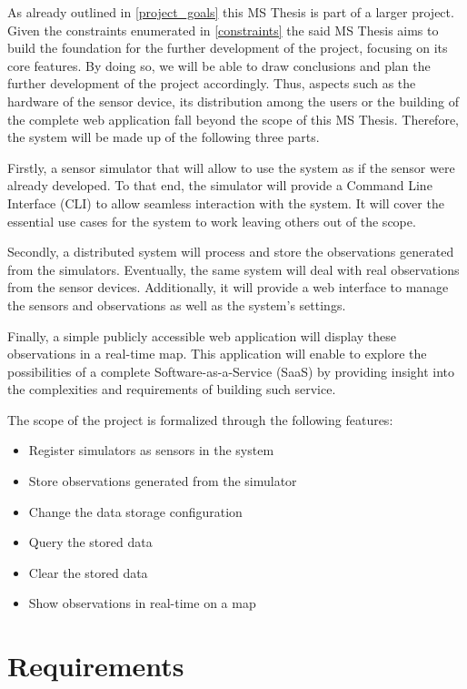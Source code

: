 As already outlined in \ref{project_goals} this MS Thesis is part of a larger project. Given the constraints enumerated in \ref{constraints} the said MS Thesis aims to build the foundation for the further development of the project, focusing on its core features. By doing so, we will be able to draw conclusions and plan the further development of the project accordingly. Thus, aspects such as the hardware of the sensor device, its distribution among the users or the building of the complete web application fall beyond the scope of this MS Thesis. Therefore, the system will be made up of the following three parts.

Firstly, a sensor simulator that will allow to use the system as if the sensor were already developed. To that end, the simulator will provide a Command Line Interface (CLI) to allow seamless interaction with the system. It will cover the essential use cases for the system to work leaving others out of the scope.

Secondly, a distributed system will process and store the observations generated from the simulators. Eventually, the same system will deal with real observations from the sensor devices. Additionally, it will provide a web interface to manage the sensors and observations as well as the system's settings.

Finally, a simple publicly accessible web application will display these observations in a real-time map. This application will enable to explore the possibilities of a complete Software-as-a-Service (SaaS) by providing insight into the complexities and requirements of building such service.

The scope of the project is formalized through the following features:

\begin{itemize}
\item Register simulators as sensors in the system
\item Store observations generated from the simulator
\item Change the data storage configuration
\item Query the stored data
\item Clear the stored data
\item Show observations in real-time on a map
\end{itemize}

\section{Requirements}

